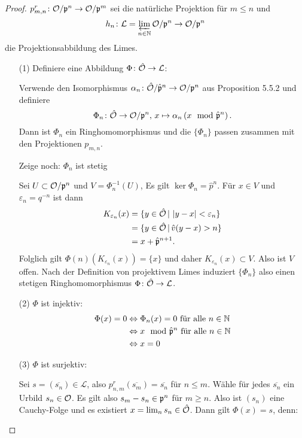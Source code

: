 

\begin{proof}
$p^r_{m,n} \colon \mathcal{O} / \mathfrak{p}^n \rightarrow \mathcal{O}/ \mathfrak{p}^m$ sei die natürliche Projektion für $m\leq n$
und 
\[ h_n \colon \mathcal{L} = \varprojlim\limits_{n\in\mathbb{N}} \mathcal{O}/\mathfrak{p}^n \to \mathcal{O}/\mathfrak{p}^n
\]
die Projektionsabbildung des Limes.
\begin{itemize} 
\item[(1)] Definiere eine Abbildung $\Phi \colon \hat{\mathcal{O}} \to\mathcal{L}$:
	
		Verwende den Isomorphismus $\alpha_n \colon \hat{\mathcal{O}}/ \hat{\mathfrak{p}}^n \to \mathcal{O} / \mathfrak{p}^n$ aus Proposition 5.5.2 und definiere 
		\[ \Phi_n \colon \hat{\mathcal{O}} \to \mathcal{O} / \mathfrak{p}^n, \, x \mapsto \alpha_n \left(  x \mod \hat{\mathfrak{p}}^n \right).
		\]
		Dann ist $\Phi_n$ ein Ringhomomorphismus und die $\{ \Phi_n \}$ passen zusammen mit den Projektionen $p_{m,n}$.
		
		\bigskip Zeige noch: $\Phi_n$ ist stetig
		
		Sei $U \subset \mathcal{O}/\mathfrak{p}^n$ und $V=\Phi_n^{-1}(U)$, Es gilt $\ker \Phi_n = \hat{p}^n$. Für $x\in V$ und $\varepsilon_n = q^{-n}$ ist dann
		\begin{align*}
			K_{\varepsilon_n}(x) 
			&= \{ y \in \hat{\mathcal{O}} \,|\, \left|{y-x}\right|< \varepsilon_n  \} \\
			&= \{ y \in \hat{\mathcal{O}} \,|\, \hat{v}(y-x) > n  \} \\
			&= x+ \hat{\mathfrak{p}}^{n+1}.
		\end{align*}
		Folglich gilt $\Phi(n)( K_{\varepsilon_n}(x)  ) = \{x\}$ und daher $K_{\varepsilon_n}(x)  \subset V$. Also ist $V$ offen.
		Nach der Definition von projektivem Limes induziert $\{\Phi_n \}$ also einen stetigen Ringhomomorphismus  $\Phi \colon \hat{\mathcal{O}} \to\mathcal{L}$.
\item[(2)] $\Phi$ ist injektiv:
\begin{align*}
\Phi(x) = 0
&\Leftrightarrow \Phi_n(x) = 0 \text{ für alle } n \in \mathbb{N} \\
&\Leftrightarrow x \mod \hat{\mathfrak{p}}^n  \text{ für alle } n \in \mathbb{N} \\
&\Leftrightarrow x=0
\end{align*} 
\item[(3)] $\Phi$ ist surjektiv:

Sei $s=(\overline{s_n}) \in \mathcal{L}$, also $p^r_{n,m}(\overline{s_m}) = \overline{s_n}$ für $n\leq m$. Wähle für jedes $\overline{s_n}$ ein Urbild $s_n \in \mathcal{O}$. Es gilt also $s_m-s_n \in \mathfrak{p}^n$ für $m\geq n$. Also ist $(s_n)$ eine Cauchy-Folge und es existiert $x=\lim_n s_n \in \hat{\mathcal{O}}$.
Dann gilt $\Phi(x)=s$, denn:


\end{itemize}
\end{proof}
